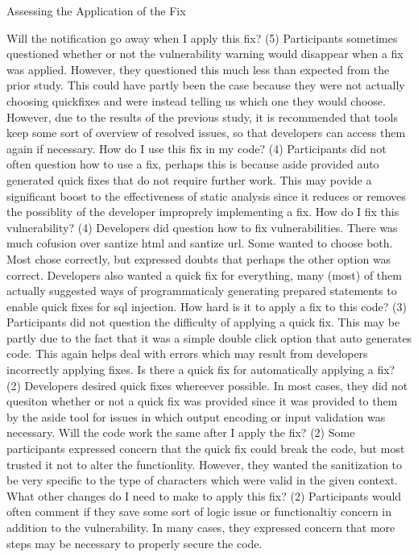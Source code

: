 \documentclass[twoside,letterpaper]{soups}
\begin{document}
 Assessing the Application of the Fix

Will the notification go away when I apply this fix? (5) Participants sometimes questioned whether or not the vulnerability warning would disappear when a fix was applied. However, they questioned this much less than expected from the prior study. This could have partly been the case because they were not actually choosing quickfixes and were instead telling us which one they would choose. However, due to the results of the previous study, it is recommended that tools keep some sort of overview of resolved issues, so that developers can access them again if necessary.
How do I use this fix in my code? (4) Participants did not often question how to use a fix, perhaps this is because aside provided auto generated quick fixes that do not require further work. This may povide a significant boost to the effectiveness of static analysis since it reduces or removes the possiblity of the developer improprely implementing a fix.
How do I fix this vulnerability? (4) Developers did question how to fix vulnerabilities. There was much cofusion over santize html and santize url. Some wanted to choose both. Most chose correctly, but expressed doubts that perhaps the other option was correct.  Developers also wanted a quick fix for everything, many (most) of them actually suggested ways of programmaticaly generating prepared statements to enable quick fixes for sql injection.
How hard is it to apply a fix to this code? (3) Participants did not question the difficulty of applying a quick fix. This may be partly due to the fact that it was a simple double click option that auto generates code. This again helps deal with errors which may result from developers incorrectly applying fixes. 
Is there a quick fix for automatically applying a fix? (2) Developers desired quick fixes whereever possible. In most cases, they did not quesiton whether or not a quick fix was provided since it was provided to them by the aside tool for issues in which output encoding or input validation was necessary.
Will the code work the same after I apply the fix? (2) Some participants expressed concern that the quick fix could break the code, but most trusted it not to alter the functionlity. However, they wanted the sanitization to be very specific to the type of characters which were valid in the given context.
What other changes do I need to make to apply this fix? (2) Participants would often comment if they save some sort of logic issue or functionaltiy concern in addition to the vulnerability. In many cases, they expressed concern that more steps may be necessary to properly secure the code.
\end{document}

